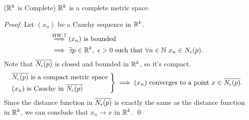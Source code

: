 \begin{theorem}($\mathbb{R}^k$ is Complete)
    \label{thm3.11c}
    $\mathbb{R}^k$ is a complete metric space.
\end{theorem}
\begin{proof}
    Let $(x_n)$ be a Cauchy sequence in $\mathbb{R}^k$.
    \begin{align*}
        &\overset{\text{HW 7}}{\implies} (x_n) \text{ is bounded} \\
        &\implies \exists p \in \mathbb{R}^k, ~\epsilon > 0 \text{ such that } \forall n \in \mathbb{N} ~x_n \in N_{\epsilon}(p).
    \end{align*}
    Note that $\overline{N_{\epsilon}(p)}$ is closed and bounded in $\mathbb{R}^k$, so it's compact.
    $$
    \begin{rcases*}
        \closure{\nbhd{\epsilon}{p}} \text{ is a compact metric space } \\
        (x_n) \text{ is Cauchy in } \closure{\nbhd{\epsilon}{p}}
    \end{rcases*}
    \implies (x_n) \text{ converges to a point $x\in \closure{\nbhd{\epsilon}{p}}$}.
    $$
    Since the distance function in $\overline{N_{\epsilon}(p)}$ is exactly the same as the distance function in $\mathbb{R}^k$, we can conclude that $x_n \to x$ in $\mathbb{R}^k$. \qed
\end{proof}